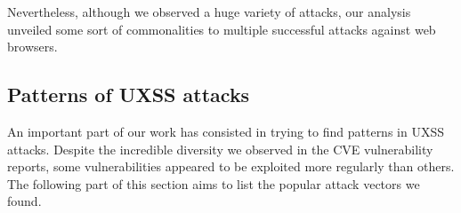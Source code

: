 \documentclass[journal]{IEEEtran}
\begin{document}
\medskip

Nevertheless, although we observed a huge variety of attacks, our analysis unveiled some sort of commonalities to multiple successful attacks against web browsers.

\subsection{Patterns of UXSS attacks}

An important part of our work has consisted in trying to find patterns in UXSS attacks. Despite the incredible diversity we observed in the CVE vulnerability reports, some vulnerabilities appeared to be exploited more regularly than others. \\
The following part of this section aims to list the popular attack vectors we found.

\medskip
\end{document}
